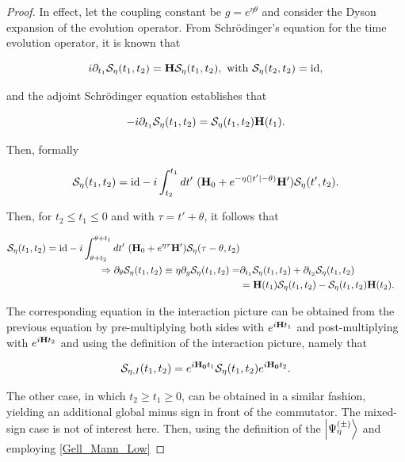\begin{proof}

In effect, let the coupling constant be $g = e^{\eta \theta}$ and consider the Dyson expansion of the evolution operator. From Schr\"odinger's equation for the time evolution operator, it is known that 

$$
    i \partial_{t_1} \mathcal{S}_{\eta}(t_1,t_2) = {\bf H} \mathcal{S}_{\eta}(t_1,t_2), \textnormal{ with } \mathcal{S}_{\eta}(t_2,t_2) = \textnormal{id}, 
$$

and the adjoint Schr\"odinger equation establishes that 

$$
-i \partial_{t_1} \mathcal{S}_{\eta}(t_1,t_2) = \mathcal{S}_{\eta}(t_1,t_2) {\bf H}(t_1). 
$$

Then, formally 

$$
    \mathcal{S}_{\eta}(t_1,t_2) = \textnormal{id} - i \int_{t_2}^{t_1}dt' \textnormal{ } ({\bf H}_0 + e^{-\eta (|t'| - \theta)} {\bf H}') \mathcal{S}_{\eta}(t',t_2).
$$


Then, for $t_2 \leq t_1 \leq 0$ and with $\tau = t' + \theta$, it follows that 

\begin{equation}
    \begin{split}
        \mathcal{S}_{\eta}(t_1,t_2) = \textnormal{id} - i \int_{\theta + t_2}^{\theta + t_1}dt' \textnormal{ } ({\bf H}_0 + e^{\eta \tau} {\bf H}') \mathcal{S}_{\eta}(\tau - \theta,t_2) \\
        \Rightarrow \partial_{\theta} \mathcal{S}_{\eta}(t_1,t_2) \equiv \eta \partial_{g} \mathcal{S}_{\eta}(t_1,t_2) =& \partial_{t_1} \mathcal{S}_{\eta}(t_1,t_2) + \partial_{t_2}\mathcal{S}_{\eta}(t_1,t_2) \\
        &= {\bf H}(t_1) \mathcal{S}_{\eta}(t_1,t_2) - \mathcal{S}_{\eta}(t_1,t_2) {\bf H}(t_2).
    \end{split}
    \label{Gell_Mann_Low}
\end{equation}

The corresponding equation in the interaction picture can be obtained from the previous equation by pre-multiplying both sides with $e^{i {\bf H} t_1}$ and post-multiplying with $e^{i {\bf H} t_2}$ and using the definition of the interaction picture, namely that 

$$
    \mathcal{S}_{\eta, I}(t_1,t_2) = e^{i {\bf H_0} t_1} \mathcal{S}_{\eta}(t_1,t_2) e^{i {\bf H_0} t_2}. 
$$

The other case, in which $t_2 \geq t_1 \geq 0$, can be obtained in a similar fashion, yielding an additional global minus sign in front of the commutator. The mixed-sign case is not of interest here. Then, using the definition of the $\ket{\Psi_{\eta}^{(\pm)}}$ and employing \cref{Gell_Mann_Low}


\end{proof}
